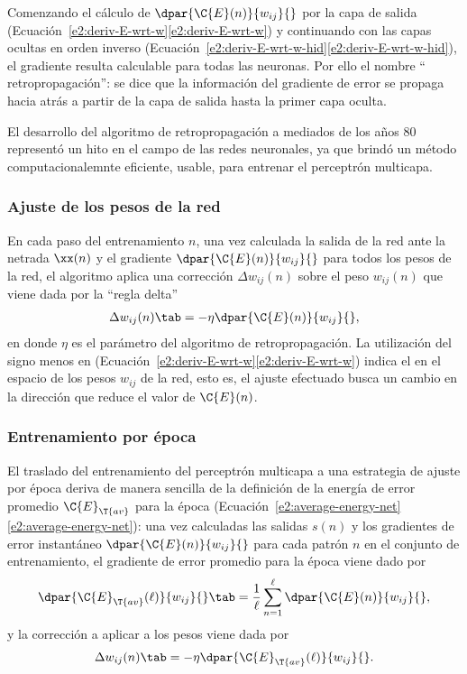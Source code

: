 Comenzando el cálculo de $\dpar{\C{E}(n)}{w_{ij}}{}$ por la capa de
salida
(\iflatexml{}Ecuación~\ref{e2:deriv-E-wrt-w}\else\autoref{e2:deriv-E-wrt-w}\fi)
y continuando con las capas ocultas en orden inverso
(\iflatexml{}Ecuación~\ref{e2:deriv-E-wrt-w-hid}\else\autoref{e2:deriv-E-wrt-w-hid}\fi),
el gradiente resulta calculable para todas las neuronas.  Por ello el
nombre `` retropropagación'': se dice que la información del gradiente
de error se propaga hacia atrás a partir de la capa de salida hasta la
primer capa oculta.

El desarrollo del algoritmo de retropropagación a mediados de los años
80 representó un hito en el campo de las redes neuronales, ya
que brindó un método computacionalemnte eficiente, usable, para
entrenar el perceptrón multicapa.
%
\subsubsection{Ajuste de los pesos de la red}
%
En cada paso del entrenamiento $n$, una vez calculada la salida de la
red ante la netrada $\xx(n)$ y el gradiente
$\dpar{\C{E}(n)}{w_{ij}}{}$ para todos los pesos de la red, el
algoritmo aplica una corrección $\Delta{}w_{ij}(n)$ sobre el peso
$w_{ij}(n)$ que viene dada por la ``regla delta''
%
\begin{align}\label{e2:delta-rule}
  \Delta w_{ij}(n)\tab=-\eta\dpar{\C{E}(n)}{w_{ij}}{},
\end{align}
%
en donde $\eta$ es el parámetro  del
algoritmo de retropropagación. La utilización del signo menos en
(\iflatexml{}Ecuación~\ref{e2:deriv-E-wrt-w}\else\autoref{e2:deriv-E-wrt-w}\fi)
indica el  en el espacio de los pesos
$w_{ij}$ de la red, esto es, el ajuste efectuado busca un cambio en la
dirección que reduce el valor de $\C{E}(n)$.
%
\subsubsection{Entrenamiento por época}
%
El traslado del entrenamiento del perceptrón multicapa a una estrategia
de ajuste por época deriva de manera sencilla de la definición de
la energía de error promedio $\C{E}_{\T{av}}$ para la época 
(\iflatexml{}Ecuación~\ref{e2:average-energy-net}\else\autoref{e2:average-energy-net}\fi):
una vez calculadas las salidas $s(n)$ y los gradientes de error instantáneo
$\dpar{\C{E}(n)}{w_{ij}}{}$ para cada patrón $n$ en el conjunto de entrenamiento,
el gradiente de error promedio para la época viene dado por
%
\begin{align}
  \dpar{\C{E}_{\T{av}}(\ell)}{w_{ij}}{}\tab=\frac{1}{\ell}\sum_{n=1}^\ell\dpar{\C{E}(n)}{w_{ij}}{},
\end{align}
%
y la corrección a aplicar a los pesos viene dada por
%
\begin{align}\label{e2:delta-rule-epoch}
  \Delta w_{ij}(n)\tab=-\eta\dpar{\C{E}_{\T{av}}(\ell)}{w_{ij}}{}.
\end{align}
%

